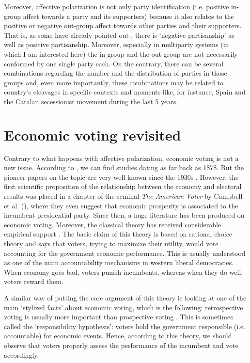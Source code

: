 \documentclass[a4paper, svgnames]{article}
\begin{document}
Moreover, affective polarization is not only party identification (i.e. positive in-group affect towards a party and its supporters) because it also relates to the positive or negative out-group affect towards other parties and their supporters. That is, as some have already pointed out \citep{Medeiros2013, Abramowitz2016}, there is `negative partisanship' as well as positive partisanship. Moreover, especially in multiparty systems (in which I am interested here) the in-group and the out-group are not necessarily conformed by one single party each. On the contrary, there can be several combinations regarding the number and the distribution of parties in those groups and, even more importantly, these combinations may be related to country's cleavages in specific contexts and moments like, for instance, Spain and the Catalan secessionist movement during the last 5 years.

\section{Economic voting revisited}

Contrary to what happens with affective polarization, economic voting is not a new issue. According to \cite{LewisBeck2007}, we can find studies dating as far back as 1878. But the pioneer papers on the topic are very well known since the 1930s \citep{Tibbitts2015, Gosnell1940, Wilkinson1950}. However, the first scientific proposition of the relationship between the economy and electoral results was placed in a chapter of the seminal \textit{The American Voter} by Campbell et al. (\citeyear[Chapter 14]{campbellAmericanVoter1960}), where they even suggest that economic prosperity is associated to the incumbent presidential party. Since then, a huge literature has been produced on economic voting. Moreover, the classical theory has received considerable empirical support \citep{Kinder1979, Lewis-Beck1988, Lewis-Beck2000, LewisBeck2007, Lewis-Beck2011}. The basic claim of this theory is based on rational choice theory and says that voters, trying to maximize their utility, would vote accounting for the government economic performance. This is usually understood as one of the main accountability mechanisms in western liberal democracies. When economy goes bad, voters punish incumbents, whereas when they do well, voters reward them.

A similar way of putting the core argument of this theory is looking at one of the main `stylized facts' about economic voting, which is the following: retrospective voting is usually more important than prospective voting \citep{Lewis-Beck2000}. This is sometimes called the `responsibility hypothesis': voters hold the government responsible (i.e. accountable) for economic events. Hence, according to this theory, we should observe that voters properly assess the performance of the incumbent and vote accordingly.
\end{document}
